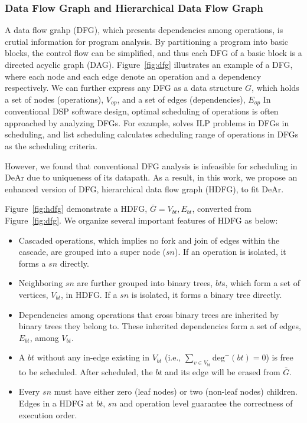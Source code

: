\documentclass[12pt]{article}
\begin{document}
\begin{CJK}{UTF8}{bkai}
        \subsubsection{Data Flow Graph and Hierarchical Data Flow Graph}
        \label{sec:hdfg}
            A data flow grahp (DFG), which presents dependencies among operations, is crutial information for program analysis.
            By partitioning a program into basic blocks, the control flow can be simplified, and thus each DFG of a basic block is a directed acyclic graph (DAG).
            Figure~\ref{fig:dfg} illustrates an example of a DFG, where each node and each edge denote an operation and a dependency respectively.
            We can further express any DFG as a data structure $G$, which holds a set of nodes (operations), $V_{op}$, and a set of edges (dependencies), $E_{op}$
            In conventional DSP software design, optimal scheduling of operations is often approached by analyzing DFGs.
            For example, \cite{dsplite} solves ILP problems \cite{ilp} in DFGs in scheduling, 
            and list scheduling \cite{list} calculates scheduling range of operations in DFGs as the scheduling criteria. \\\indent

            However, we found that conventional DFG analysis is infeasible for scheduling in DeAr due to uniqueness of its datapath.
            As a result, in this work, we propose an enhanced version of DFG, hierarchical data flow graph (HDFG), to fit DeAr.

            Figure~\ref{fig:hdfg} demonstrate a HDFG, $\bar{G} = {V_{bt}, E_{bt}}$, converted from Figure~\ref{fig:dfg}.
            We organize several important features of HDFG as below: 
            \begin{itemize}
                \item Cascaded operations, which implies no fork and join of edges within the cascade, are grouped into a super node ($sn$). 
                      If an operation is isolated, it forms a $sn$ directly.
                \item Neighboring $sn$ are further grouped into binary trees, $bt$s, which form a set of vertices, $V_{bt}$, in HDFG.
                      If a $sn$ is isolated, it forms a binary tree directly.
                \item Dependencies among operations that cross binary trees are inherited by binary trees they belong to.
                      These inherited dependencies form a set of edges, $E_{bt}$, among $V_{bt}$.
                \item A $bt$ without any in-edge existing in $V_{bt}$ (i.e., $\sum_{v \in V_{bt}}\textrm{deg}^-(bt) = 0$) is free to be scheduled. 
                      After scheduled, the $bt$ and its edge will be erased from $\bar{G}$.
                \item Every $sn$ must have either zero (leaf nodes) or two (non-leaf nodes) children.
                      Edges in a HDFG at $bt$, $sn$ and operation level guarantee the correctness of execution order.
            \end{itemize}


\end{CJK}
\end{document}
